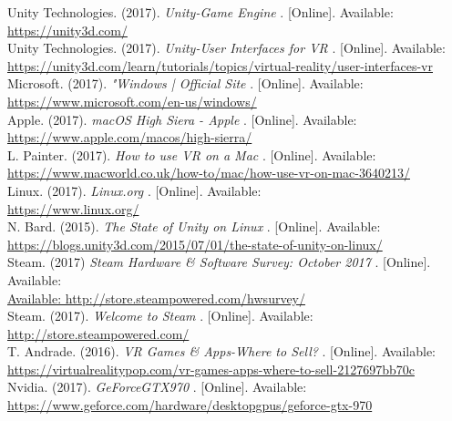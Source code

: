 \documentclass[letterpaper,10pt,onecolumn,compsoc]{IEEEtran}
\begin{document}
\begin{thebibliography}{9}
Unity Technologies. (2017). 
\textit{Unity-Game Engine} 
. [Online]. Available: 
\\\url{https://unity3d.com/}
\\
Unity Technologies. (2017). 
\textit{Unity-User Interfaces for VR} 
. [Online]. Available: 
\\\url{https://unity3d.com/learn/tutorials/topics/virtual-reality/user-interfaces-vr}
\\
Microsoft. (2017). 
\textit{"Windows | Official Site} 
. [Online]. Available: 
\\\url{https://www.microsoft.com/en-us/windows/}
\\
Apple. (2017). 
\textit{macOS High Siera - Apple} 
. [Online]. Available: 
\\\url{https://www.apple.com/macos/high-sierra/}
\\
L. Painter. (2017). 
\textit{How to use VR on a Mac} 
. [Online]. Available: 
\\\url{https://www.macworld.co.uk/how-to/mac/how-use-vr-on-mac-3640213/}
\\
Linux. (2017). 
\textit{Linux.org} 
. [Online]. Available: 
\\\url{https://www.linux.org/}
\\
N. Bard. (2015). 
\textit{The State of Unity on Linux} 
. [Online]. Available: 
\\\url{https://blogs.unity3d.com/2015/07/01/the-state-of-unity-on-linux/}
\\
Steam.	(2017)
\textit{Steam Hardware \& Software Survey: October 2017} 
. [Online]. Available: 
\\\url{Available: http://store.steampowered.com/hwsurvey/}
\\
Steam. (2017). 
\textit{Welcome to Steam} 
. [Online]. Available: 
\\\url{http://store.steampowered.com/}
\\
T. Andrade.	(2016).
\textit{VR Games \& Apps-Where to Sell?}
. [Online]. Available: 
\\\url{https://virtualrealitypop.com/vr-games-apps-where-to-sell-2127697bb70c}
\\
Nvidia. (2017). 
\textit{GeForceGTX970} 
. [Online]. Available: 
\\\url{https://www.geforce.com/hardware/desktopgpus/geforce-gtx-970}
\\

\end{thebibliography}
\end{document}
